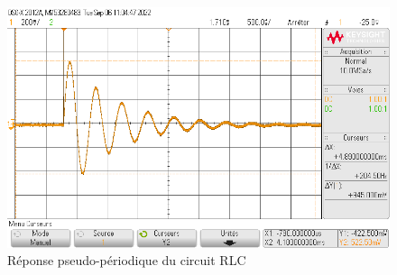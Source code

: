 \documentclass[a4paper]{article}
\begin{document}
	\bigskip

	\begin{figure}[H]
		\centering
		\includegraphics[scale=0.4]{figures/signal2.png}
		\caption{Réponse pseudo-périodique du circuit RLC}
	\end{figure}

	\sign
\end{document}
